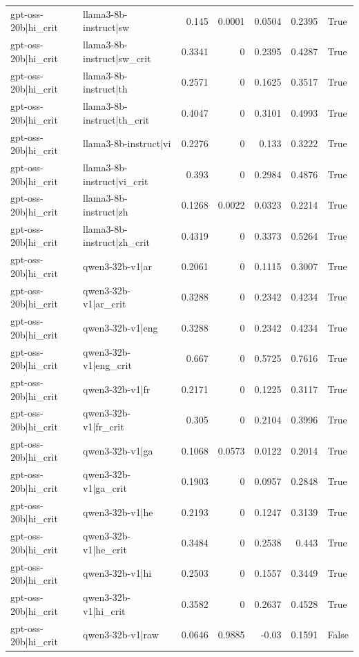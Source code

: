 \begin{table}
\begin{tabular}{l l r r r r l}
gpt-oss-20b|hi_crit & llama3-8b-instruct|sw & 0.145 & 0.0001 & 0.0504 & 0.2395 & True \\
gpt-oss-20b|hi_crit & llama3-8b-instruct|sw_crit & 0.3341 & 0 & 0.2395 & 0.4287 & True \\
gpt-oss-20b|hi_crit & llama3-8b-instruct|th & 0.2571 & 0 & 0.1625 & 0.3517 & True \\
gpt-oss-20b|hi_crit & llama3-8b-instruct|th_crit & 0.4047 & 0 & 0.3101 & 0.4993 & True \\
gpt-oss-20b|hi_crit & llama3-8b-instruct|vi & 0.2276 & 0 & 0.133 & 0.3222 & True \\
gpt-oss-20b|hi_crit & llama3-8b-instruct|vi_crit & 0.393 & 0 & 0.2984 & 0.4876 & True \\
gpt-oss-20b|hi_crit & llama3-8b-instruct|zh & 0.1268 & 0.0022 & 0.0323 & 0.2214 & True \\
gpt-oss-20b|hi_crit & llama3-8b-instruct|zh_crit & 0.4319 & 0 & 0.3373 & 0.5264 & True \\
gpt-oss-20b|hi_crit & qwen3-32b-v1|ar & 0.2061 & 0 & 0.1115 & 0.3007 & True \\
gpt-oss-20b|hi_crit & qwen3-32b-v1|ar_crit & 0.3288 & 0 & 0.2342 & 0.4234 & True \\
gpt-oss-20b|hi_crit & qwen3-32b-v1|eng & 0.3288 & 0 & 0.2342 & 0.4234 & True \\
gpt-oss-20b|hi_crit & qwen3-32b-v1|eng_crit & 0.667 & 0 & 0.5725 & 0.7616 & True \\
gpt-oss-20b|hi_crit & qwen3-32b-v1|fr & 0.2171 & 0 & 0.1225 & 0.3117 & True \\
gpt-oss-20b|hi_crit & qwen3-32b-v1|fr_crit & 0.305 & 0 & 0.2104 & 0.3996 & True \\
gpt-oss-20b|hi_crit & qwen3-32b-v1|ga & 0.1068 & 0.0573 & 0.0122 & 0.2014 & True \\
gpt-oss-20b|hi_crit & qwen3-32b-v1|ga_crit & 0.1903 & 0 & 0.0957 & 0.2848 & True \\
gpt-oss-20b|hi_crit & qwen3-32b-v1|he & 0.2193 & 0 & 0.1247 & 0.3139 & True \\
gpt-oss-20b|hi_crit & qwen3-32b-v1|he_crit & 0.3484 & 0 & 0.2538 & 0.443 & True \\
gpt-oss-20b|hi_crit & qwen3-32b-v1|hi & 0.2503 & 0 & 0.1557 & 0.3449 & True \\
gpt-oss-20b|hi_crit & qwen3-32b-v1|hi_crit & 0.3582 & 0 & 0.2637 & 0.4528 & True \\
gpt-oss-20b|hi_crit & qwen3-32b-v1|raw & 0.0646 & 0.9885 & -0.03 & 0.1591 & False \\

\end{tabular}
\end{table}
